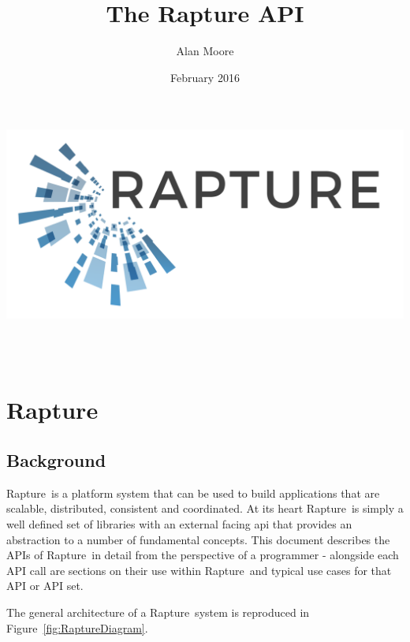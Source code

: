\documentclass[12pt,twoside,a4paper]{book}
\newcommand{\Rapture}{Rapture~}
\begin{document}
\title{The Rapture API}
\author{Alan Moore}
\date{February 2016}

\makeatletter
    \begin{titlepage}
      \includegraphics[width=0.7\linewidth]{Graphics/RaptureLogo.png}\\[4ex]
        \begin{center}
            {\huge \bfseries  \@title }\\[2ex]
            {\LARGE  \@author}\\[50ex]
            {\large \@date}
        \end{center}
    \end{titlepage}
\makeatother
\thispagestyle{empty}
\newpage


\tableofcontents
\setcounter{page}{1} %


\part{Rapture}
\chapter{Background}
\Rapture is a platform system that can be used to build applications that are scalable,
distributed, consistent and coordinated. At its heart \Rapture is simply a well defined
set of libraries with an external facing api that provides an abstraction to a number
of fundamental concepts. This document describes the APIs of \Rapture in detail from the
perspective of a programmer - alongside each API call are sections on their use within
\Rapture and typical use cases for that API or API set.

The general architecture of a \Rapture system is reproduced in Figure~\vref{fig:RaptureDiagram}.
\end{document}
